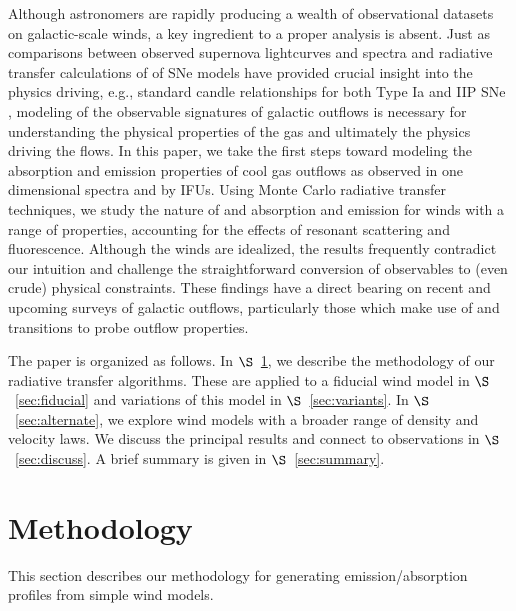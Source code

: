 \documentclass[]{emulateapj}
\begin{document}
Although astronomers are rapidly producing a wealth of observational
datasets on galactic-scale winds, a key ingredient to a proper
analysis is absent.  Just as comparisons between observed supernova 
lightcurves and spectra and radiative transfer calculations of
of SNe models have provided crucial insight into the physics driving,
e.g., standard candle relationships for both Type Ia and IIP SNe 
\citep{kw07,kw09}, modeling of the observable signatures of galactic
outflows is necessary for understanding the physical
properties of the gas and ultimately the physics driving the flows. 
In this paper, we take the first steps toward modeling the absorption
and emission properties of cool gas outflows as observed in one
dimensional spectra and by IFUs.  Using Monte Carlo
radiative transfer techniques, we study the nature of  and
 absorption and emission for winds with a range of
properties, accounting for the effects of resonant scattering and
fluorescence. 
Although the winds are idealized, the results frequently
contradict our intuition and 
challenge the straightforward conversion of observables to (even crude) physical
constraints.  These findings have a direct bearing on
recent and upcoming surveys of galactic outflows, particularly those
which make use of  and  transitions to probe
outflow properties.

The paper is organized as follows.  In $\S$~\ref{sec:method}, we
describe the methodology of our radiative transfer algorithms.  These
are applied to a fiducial wind model in $\S$~\ref{sec:fiducial} and
variations of this model in $\S$~\ref{sec:variants}.  In
$\S$~\ref{sec:alternate}, we explore wind models with a broader range
of density and velocity laws. We discuss the principal results and
connect to observations in $\S$~\ref{sec:discuss}.  A brief summary is
given in $\S$~\ref{sec:summary}. 

\section{Methodology}
\label{sec:method}

This section describes our methodology for generating
emission/absorption profiles from simple wind models.
\end{document}
